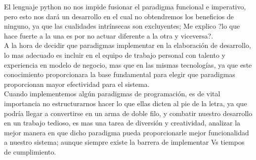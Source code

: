 \begin{multicols}{2}
El lenguaje python no nos impide fusionar el paradigma funcional e imperativo, pero esto nos dará un desarrollo en el cual no 
obtendremos los beneficios de ninguno, ya que las cualidades intrínsecas son excluyentes; Me explico ?lo que hace fuerte a la una es
por no actuar diferente a la otra y viceversa?.\\

A la hora de decidir que paradigmas implementar en la elaboración de desarrollo, lo mas adecuado es incluir en el equipo 
de trabajo personal con talento y experiencia en modelo de negocio, mas que en las mismas tecnologías, ya que este conocimiento
proporcionara la base fundamental para elegir que paradigmas proporcionan mayor efectividad para el sistema.\\

Cuando implementemos algún paradigmas de programación, es de vital importancia no estructurarnos hacer lo que ellas dicten 
al pie de la letra, ya que podría llegar a convertirse en un arma de doble filo, y combatir nuestro desarrollo en un trabajo tedioso,
es mas una tarea de diversión y creatividad, analizar la mejor manera en que dicho paradigma pueda proporcionarle mejor 
funcionalidad a nuestro sistema; aunque siempre existe la barrera de implementar Vs tiempos de cumplimiento.\\



\end{multicols}
